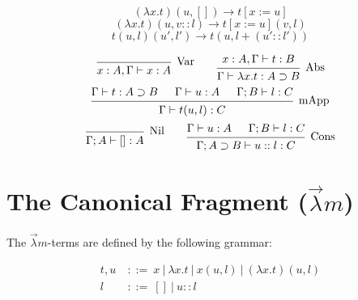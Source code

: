 \begin{definition}  
  \[
    (\lambda x . t)(u, []) \to t[x := u]
    \label{eq:ruleb1} \tag{$\beta_1$}
  \]
  \[
    (\lambda x . t)(u, v::l) \to t[x := u](v, l)
    \label{eq:ruleb2} \tag{$\beta_2$}
  \]
  \[
    t(u, l)(u', l') \to t(u, l + (u'::l'))
    \label{eq:ruleh} \tag{$h$}
  \]
\end{definition}

\begin{definition}
  \[
    \begin{prooftree}
      \infer0[Var]{ x:A, \Gamma \vdash x:A } 
    \end{prooftree}
    \qquad
    \begin{prooftree}
      \hypo{ x:A, \Gamma \vdash t:B }
      \infer1[Abs]{ \Gamma \vdash \lambda x . t : A \supset B  } 
    \end{prooftree}
  \]
  \[
    \begin{prooftree}
      \hypo{ \Gamma \vdash t : A \supset B }
      \hypo{ \Gamma \vdash u : A }
      \hypo{ \Gamma ; B \vdash l : C }	
      \infer3[mApp]{ \Gamma \vdash t(u, l) : C } 
    \end{prooftree}
  \]
  \[
    \begin{prooftree}
      \infer0[Nil]{ \Gamma ; A \vdash []:A } 
    \end{prooftree}
    \qquad
    \begin{prooftree}
      \hypo{ \Gamma \vdash u:A }
      \hypo{ \Gamma ; B \vdash l:C }
      \infer2[Cons]{ \Gamma ; A \supset B \vdash  u::l : C } 
    \end{prooftree}
  \]
\end{definition}

\section{The Canonical Fragment ($\vec \lambda m$)}


\begin{definition}
  The $\vec \lambda m$-terms are defined by the following grammar:
  
  \begin{align*} 
    t, u \ &::= \ x \ | \ \lambda x . t \ | \ x(u, l) \ | \ (\lambda x . t)(u, l) \\
    l      &::= \ []\  | \ u :: l
  \end{align*}
\end{definition}

